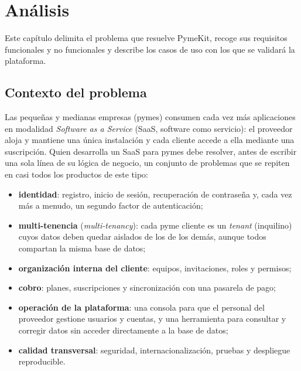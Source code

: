 
\chapter{Análisis}
\label{cap:analisis}

Este capítulo delimita el problema que resuelve PymeKit, recoge sus
requisitos funcionales y no funcionales y describe los casos de uso con los
que se validará la plataforma.

\section{Contexto del problema}
\label{sec:contexto-problema}

Las pequeñas y medianas empresas (pymes) consumen cada vez más aplicaciones en
modalidad \textit{Software as a Service} (SaaS, software como servicio): el
proveedor aloja y mantiene una única instalación y cada cliente accede a ella
mediante una suscripción. Quien desarrolla un SaaS para pymes debe resolver,
antes de escribir una sola línea de su lógica de negocio, un conjunto de
problemas que se repiten en casi todos los productos de este tipo:

\begin{itemize}
  \item \textbf{identidad}: registro, inicio de sesión, recuperación de
        contraseña y, cada vez más a menudo, un segundo factor de
        autenticación;
  \item \textbf{multi-tenencia} (\textit{multi-tenancy}): cada pyme cliente
        es un \textit{tenant} (inquilino) cuyos datos deben quedar aislados de
        los de los demás, aunque todos compartan la misma base de datos;
  \item \textbf{organización interna del cliente}: equipos, invitaciones,
        roles y permisos;
  \item \textbf{cobro}: planes, suscripciones y sincronización con una
        pasarela de pago;
  \item \textbf{operación de la plataforma}: una consola para que el
        personal del proveedor gestione usuarios y cuentas, y una herramienta
        para consultar y corregir datos sin acceder directamente a la base de
        datos;
  \item \textbf{calidad transversal}: seguridad, internacionalización,
        pruebas y despliegue reproducible.
\end{itemize}

